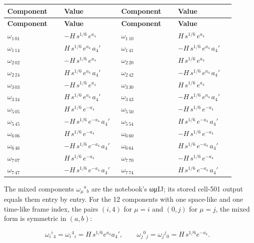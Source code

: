 \documentclass[11pt]{article}
\begin{document}
\begin{longtable}{@{}p{0.230\linewidth}p{0.230\linewidth}p{0.230\linewidth}p{0.230\linewidth}@{}}
\toprule
\textbf{Component} & \textbf{Value} & \textbf{Component} & \textbf{Value} \\
\midrule
\endfirsthead
\toprule
\textbf{Component} & \textbf{Value} & \textbf{Component} & \textbf{Value} \\
\midrule
\endhead
$\omega_{1\,01}$ & $-H\,s^{1/6}\,e^{a_4}$ & $\omega_{1\,10}$ & $H\,s^{1/6}\,e^{a_4}$ \\
$\omega_{1\,14}$ & $H\,s^{1/6}\,e^{a_4}\,a_4'$ & $\omega_{1\,41}$ & $-H\,s^{1/6}\,e^{a_4}\,a_4'$ \\
$\omega_{2\,02}$ & $-H\,s^{1/6}\,e^{a_4}$ & $\omega_{2\,20}$ & $H\,s^{1/6}\,e^{a_4}$ \\
$\omega_{2\,24}$ & $H\,s^{1/6}\,e^{a_4}\,a_4'$ & $\omega_{2\,42}$ & $-H\,s^{1/6}\,e^{a_4}\,a_4'$ \\
$\omega_{3\,03}$ & $-H\,s^{1/6}\,e^{a_4}$ & $\omega_{3\,30}$ & $H\,s^{1/6}\,e^{a_4}$ \\
$\omega_{3\,34}$ & $H\,s^{1/6}\,e^{a_4}\,a_4'$ & $\omega_{3\,43}$ & $-H\,s^{1/6}\,e^{a_4}\,a_4'$ \\
$\omega_{5\,05}$ & $H\,s^{1/6}\,e^{-a_4}$ & $\omega_{5\,50}$ & $-H\,s^{1/6}\,e^{-a_4}$ \\
$\omega_{5\,45}$ & $-H\,s^{1/6}\,e^{-a_4}\,a_4'$ & $\omega_{5\,54}$ & $H\,s^{1/6}\,e^{-a_4}\,a_4'$ \\
$\omega_{6\,06}$ & $H\,s^{1/6}\,e^{-a_4}$ & $\omega_{6\,60}$ & $-H\,s^{1/6}\,e^{-a_4}$ \\
$\omega_{6\,46}$ & $-H\,s^{1/6}\,e^{-a_4}\,a_4'$ & $\omega_{6\,64}$ & $H\,s^{1/6}\,e^{-a_4}\,a_4'$ \\
$\omega_{7\,07}$ & $H\,s^{1/6}\,e^{-a_4}$ & $\omega_{7\,70}$ & $-H\,s^{1/6}\,e^{-a_4}$ \\
$\omega_{7\,47}$ & $-H\,s^{1/6}\,e^{-a_4}\,a_4'$ & $\omega_{7\,74}$ & $H\,s^{1/6}\,e^{-a_4}\,a_4'$ \\
\bottomrule
\end{longtable}

The mixed components $\omega_\mu{}^a{}_b$ are the notebook's ωμIJ; its stored cell-501 output equals them entry by entry. For the 12 components with one space-like and one time-like frame index, the pairs $(i,4)$ for $\mu=i$ and $(0,j)$ for $\mu=j$, the mixed form is symmetric in $(a,b)$:

\[
\omega_i{}^i{}_4=\omega_i{}^4{}_i=H\,s^{1/6}e^{a_4}a_4',\qquad \omega_j{}^0{}_j=\omega_j{}^j{}_0=H\,s^{1/6}e^{-a_4}.
\]
\end{document}
